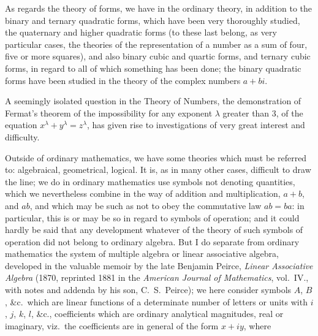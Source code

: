 \documentclass[12pt,a4paper,oneside]{book}
\begin{document}
As regards the theory of forms, we have in the ordinary theory, in addition to the binary and ternary quadratic forms, which have been very thoroughly studied, the quaternary and higher quadratic forms (to these last belong, as very particular cases, the theories of the representation of a number as a sum of four, five or more squares), and also binary cubic and quartic forms, and ternary cubic forms, in regard to all of which something has been done; the binary quadratic forms have been studied in the theory of the complex numbers $a+bi$.

A seemingly isolated question in the Theory of Numbers, the demonstration of Fermat's theorem of the impossibility for any exponent $\lambda$ greater than 3, of the equation $x^{\lambda}+y^{\lambda}=z^{\lambda}$, has given rise to investigations of very great interest and difficulty.

Outside of ordinary mathematics, we have some theories which must be referred to: algebraical, geometrical, logical. It is, as in many other cases, difficult to draw the line; we do in ordinary mathematics use symbols not denoting quantities, which we nevertheless combine in the way of addition and multiplication, $a+b$, and $ab$, and which may be such as not to obey the commutative law $ab=ba$: in particular, this is or may be so in regard to symbols of operation; and it could hardly be said that any development whatever of the theory of such symbols of operation did not belong to ordinary algebra. But I do separate from ordinary mathematics the system of multiple algebra or linear associative algebra, developed in the valuable memoir by the late Benjamin Peirce, \textit{Linear Associative Algebra} (1870, reprinted 1881 in the \textit{American Journal of Mathematics}, vol.~IV., with notes and addenda by his son, C.~S.~Peirce); we here consider symbols $A$, $B$, \&c.\ which are linear functions of a determinate number of letters or units with $i$, $j$, $k$, $l$, \&c., coefficients which are ordinary analytical magnitudes, real or imaginary, viz.\ the coefficients are in general of the form $x+iy$, where
\end{document}
